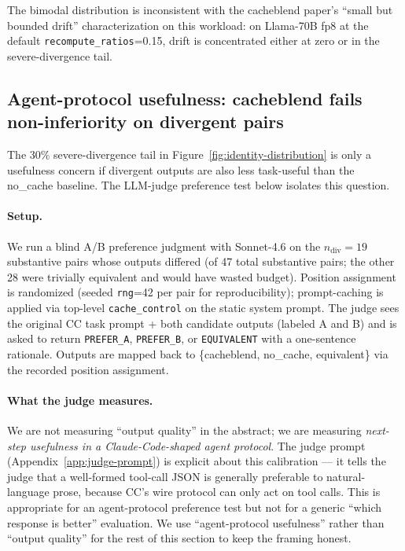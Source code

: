 The bimodal distribution is inconsistent with the cacheblend paper's
``small but bounded drift'' characterization on this workload: on
Llama-70B fp8 at the default \texttt{recompute\_ratios}=0.15, drift is
concentrated either at zero or in the severe-divergence tail.

\subsection{Agent-protocol usefulness: cacheblend fails non-inferiority on divergent pairs}
\label{sec:eval-judge}

The 30\% severe-divergence tail in Figure~\ref{fig:identity-distribution}
is only a usefulness concern if divergent outputs are also less
task-useful than the no\_cache baseline. The LLM-judge preference
test below isolates this question.

\paragraph{Setup.} We run a blind A/B preference judgment with Sonnet-4.6
on the $n_{\text{div}}{=}19$ substantive pairs whose outputs differed
(of 47 total substantive pairs; the other 28 were trivially equivalent
and would have wasted budget). Position assignment is randomized
(seeded \texttt{rng}{=}42 per pair for reproducibility); prompt-caching
is applied via top-level \texttt{cache\_control} on the static system
prompt. The judge sees the original CC task prompt + both candidate
outputs (labeled A and B) and is asked to return \texttt{PREFER\_A},
\texttt{PREFER\_B}, or \texttt{EQUIVALENT} with a one-sentence rationale.
Outputs are mapped back to \{cacheblend, no\_cache, equivalent\}
via the recorded position assignment.

\paragraph{What the judge measures.} We are not measuring ``output
quality'' in the abstract; we are measuring \emph{next-step usefulness
in a Claude-Code-shaped agent protocol}. The judge prompt
(Appendix~\ref{app:judge-prompt}) is explicit about this calibration ---
it tells the judge that a well-formed tool-call JSON is generally
preferable to natural-language prose, because CC's wire protocol can
only act on tool calls. This is appropriate for an agent-protocol
preference test but not for a generic ``which response is better''
evaluation. We use ``agent-protocol usefulness'' rather than
``output quality'' for the rest of this section to keep the framing
honest.

